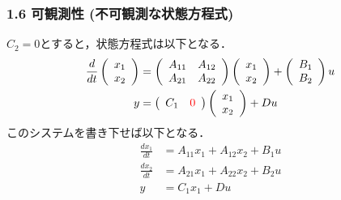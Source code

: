 \begin{frame}[t]
\frametitle{1.6 可観測性 (不可観測な状態方程式)}
$C_2=0$とすると，状態方程式は以下となる．
\begin{align}
 \frac{d}{dt}
  \left(\begin{array}{c}
         {x}_1 \\
   {x}_2
  \end{array}\right)
  &=
  \left(\begin{array}{cc}
         {A}_{11} & {A}_{12} \\
       {A}_{21} & {A}_{22}
  \end{array}\right)
  \left(\begin{array}{c}
         {x}_1 \\
   {x}_2
  \end{array}\right)
  +
  \left(\begin{array}{c}
         {B}_1 \\
   {B}_2
  \end{array}\right)
  u \\
 y &=
  \left(\begin{array}{cc}
         {C}_1 & \Red{0}
  \end{array}\right)
  \left(\begin{array}{c}
         {x}_1 \\
   {x}_2
  \end{array}\right)
  + D u
\vspace{-5mm}
\end{align}
このシステムを書き下せば以下となる．
\begin{align}
 \frac{dx_1}{dt} &= A_{11} x_1 + A_{12} x_2 + B_1 u
\label{eq:observable1} \\
 \frac{dx_2}{dt} &= A_{21} x_1 + A_{22} x_2 + B_2 u
\label{eq:observable2} \\
 y & = C_1 x_1 + Du
\label{eq:observable3}
\end{align}
\end{frame}


